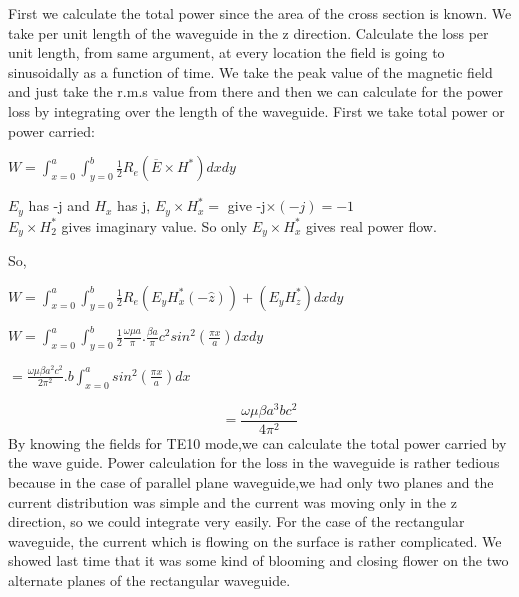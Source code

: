 First we calculate the total power since the area of the cross section is known. We take per unit length of the waveguide in the z direction. Calculate the loss per unit length, from same argument, at every location the field is going to sinusoidally as a function of time.
We take the peak value of the magnetic field and just take  the r.m.s value from there and then  we can calculate for the power loss by integrating over the length of the waveguide.
First we take total power or power carried:
\begin{center}
$W= \int_{x=0}^{a}\int_{y=0}^{b}\frac{1}{2}R_e(\overline{E} \times H^*)dxdy$
\end{center}
$E_y$ has -j and $H_x$ has j, $E_y\times H_x^*=$ give -j$\times(-j)=-1$\\
$E_y\times H_2^*$ gives imaginary value. So only $E_y\times H_x^*$ gives real power flow. 

 So,
\begin{center}
$W= \int_{x=0}^{a}\int_{y=0}^{b}\frac{1}{2}R_e(E_yH_x^*(-\hat{z}))+(E_yH_z^*)dxdy$
\end{center}
\begin{center}
$W= \int_{x=0}^{a}\int_{y=0}^{b}\frac{1}{2}\frac{\omega\mu a}{\pi}.\frac{\beta a}{\pi}c^2sin^2(\frac{\pi x}{a})dxdy$
\end{center}
\begin{center}
$=\frac{\omega\mu\beta a^2c^2}{2\pi^2}.b\int_{x=0}^{a}sin^2(\frac{\pi x}{a})dx$
\end{center}
\begin{equation}
=\frac{\omega\mu\beta a^3bc^2}{4\pi^2}
\end{equation}
By knowing the fields for TE10 mode,we can calculate the total  power  carried by the wave guide. Power calculation for the loss in the waveguide is rather tedious  because in the case of parallel plane waveguide,we had only two planes and the current distribution was simple and the current  was moving only in the z direction, so we could integrate very easily. 
For the case of the rectangular waveguide, the current which is flowing on the surface is rather complicated.
We showed last time that it was some kind of blooming and closing flower on the two alternate planes of the rectangular waveguide. 

